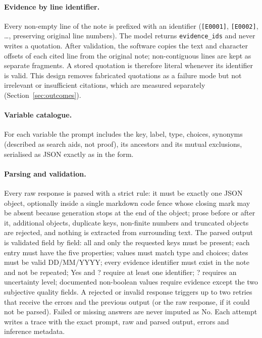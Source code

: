 \paragraph{Evidence by line identifier.} Every non-empty line of the note is prefixed with an identifier
(\texttt{[E0001]}, \texttt{[E0002]}, \ldots, preserving original line numbers). The model returns
\texttt{evidence\_ids} and never writes a quotation. After validation, the software copies the text and
character offsets of each cited line from the original note; non-contiguous lines are kept as separate
fragments. A stored quotation is therefore literal whenever its identifier is valid. This design
removes fabricated quotations as a failure mode but not irrelevant or insufficient citations, which
are measured separately (Section~\ref{sec:outcomes}).

\paragraph{Variable catalogue.} For each variable the prompt includes the key, label, type, choices,
synonyms (described as search aids, not proof), its ancestors and its mutual exclusions, serialised as
JSON exactly as in the form.

\paragraph{Parsing and validation.} Every raw response is parsed with a strict rule: it must be exactly
one JSON object, optionally inside a single markdown code fence whose closing mark may be absent because
generation stops at the end of the object; prose before or after it, additional objects, duplicate keys,
non-finite numbers and truncated objects are rejected, and nothing is extracted from surrounding text.
The parsed output is validated field by field: all and only the requested keys must be present; each
entry must have the five properties; values must match type and choices; dates must be valid DD/MM/YYYY;
every evidence identifier must exist in the note and not be repeated; Yes and ? require at least one
identifier; ? requires an uncertainty level; documented non-boolean values require evidence except the two
subjective quality fields. A rejected or invalid response triggers up to two retries that receive the
errors and the previous output (or the raw response, if it could not be parsed). Failed or missing answers
are never imputed as No. Each attempt writes a trace with the exact prompt, raw and parsed output, errors
and inference metadata.

